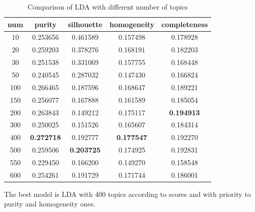 \documentclass[11pt]{article}
\begin{document}
\begin{table}[htb]
\begin{center}
\begin{tabular}{ |c|c|c|c|c| }
\hline
num & purity  & silhouette  & homogeneity  & completeness \\ \hline 
10  & 0.253656  & 0.461589  & 0.157498  & 0.178928  \\ \hline 
20  & 0.259203  & 0.378276  & 0.168191  & 0.182203  \\ \hline 
30  & 0.251538  & 0.331069  & 0.157755  & 0.168448  \\ \hline 
50  & 0.240545  & 0.287032  & 0.147430  & 0.166824  \\ \hline 
100  & 0.266465  & 0.187596  & 0.168647  & 0.189221 \\ \hline 
150  & 0.256077  & 0.167888  & 0.161589  & 0.185054 \\ \hline 
200  & 0.263843  & 0.149212  & 0.175117  & \textbf{0.194913} \\ \hline 
300  & 0.250025  & 0.151526  & 0.165607  & 0.184314 \\ \hline 
400  & \textbf{0.272718}  & 0.192777  & \textbf{0.177547}  & 0.192270 \\ \hline 
500  & 0.259506  & \textbf{0.203725}  & 0.174925  & 0.192831 \\ \hline 
550  & 0.229450  & 0.166200  & 0.149270  & 0.158548 \\ \hline 
600  & 0.254261  & 0.191729  & 0.171744  & 0.186001 \\
\hline 
\end{tabular}
\caption{Comparison of LDA with different number of topics}
\label{LDA_num_topic}
\end{center}
\end{table}
\FloatBarrier

The best model is LDA with 400 topics according to scores and with priority to purity and homogeneity ones. 
\end{document}

